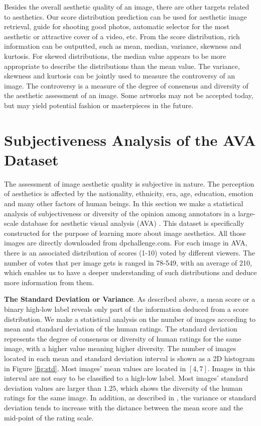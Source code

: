 \documentclass[letterpaper]{article} %
\begin{document}
Besides the overall aesthetic quality of an image, there are other targets related to aesthetics. Our score distribution prediction can be used for aesthetic image retrieval, guide for shooting good photos, automatic selector for the most aesthetic or attractive cover of a video, etc. From the score distribution, rich information can be outputted, such as mean, median, variance, skewness and kurtosis. For skewed distributions, the median value appears to be more appropriate to describe the distributions than the mean value. The variance, skewness and kurtosis can be jointly used to measure the controversy of an image. The controversy is a measure of the degree of consensus and diversity of the aesthetic assessment of an image. Some artworks may not be accepted today, but may yield potential fashion or masterpieces in the future.















\section{Subjectiveness Analysis of the AVA Dataset}
The assessment of image aesthetic quality is subjective in nature. The perception of aesthetics is affected by the nationality, ethnicity, era, age, education, emotion and many other factors of human beings. In this section we make a statistical analysis of subjectiveness or diversity of the opinion among annotators in a large-scale database for aesthetic visual analysis (AVA) \cite{MurrayCVPR2012}. This dataset is specifically constructed for the purpose of learning more about image aesthetics. All those images are directly downloaded from dpchallenge.com. For each image in AVA, there is an associated distribution of scores (1-10) voted by different viewers. The number of votes that per image gets is ranged in 78-549, with an average of 210, which enables us to have a deeper understanding of such distributions and deduce more information from them.


\textbf{The Standard Deviation or Variance}.
As described above, a mean score or a binary high-low label reveals only part of the information deduced from a score distribution. We make a statistical analysis on the number of images according to mean and standard deviation of the human ratings. The standard deviation represents the degree of consensus or diversity of human ratings for the same image, with a higher value meaning higher diversity. The number of images located in each mean and standard deviation interval is shown as a 2D histogram in Figure \ref{fig:std}. Most images' mean values are located in $[4,7]$. Images in this interval are not easy to be classified to a high-low label.  Most images' standard deviation values are larger than $1.25$, which shows the diversity of the human ratings for the same image. In addition, as described in \cite{MurrayCVPR2012}, the variance or standard deviation tends to increase with the distance between the mean score and the mid-point of the rating scale.
\end{document}
